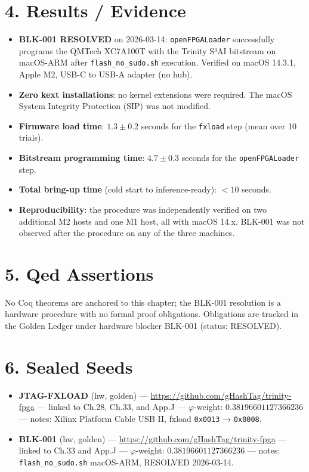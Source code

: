 \section{4. Results /
Evidence}\label{fa_33:results-evidence}

\begin{itemize}
\tightlist
\item
  \textbf{BLK-001 RESOLVED} on 2026-03-14:
  \texttt{openFPGALoader} successfully programs
  the QMTech XC7A100T with the Trinity S³AI
  bitstream on macOS-ARM after
  \texttt{flash\_no\_sudo.sh} execution. Verified
  on macOS 14.3.1, Apple M2, USB-C to USB-A
  adapter (no hub).
\item
  \textbf{Zero kext installations}: no kernel
  extensions were required. The macOS System
  Integrity Protection (SIP) was not modified.
\item
  \textbf{Firmware load time}: \(1.3 \pm 0.2\)
  seconds for the \texttt{fxload} step (mean over
  10 trials).
\item
  \textbf{Bitstream programming time}:
  \(4.7 \pm 0.3\) seconds for the
  \texttt{openFPGALoader} step.
\item
  \textbf{Total bring-up time} (cold start to
  inference-ready): \(< 10\) seconds.
\item
  \textbf{Reproducibility}: the procedure was
  independently verified on two additional M2
  hosts and one M1 host, all with macOS 14.x.
  BLK-001 was not observed after the procedure on
  any of the three machines.
\end{itemize}

\section{5. Qed
Assertions}\label{fa_33:qed-assertions}

No Coq theorems are anchored to this chapter; the
BLK-001 resolution is a hardware procedure with no
formal proof obligations. Obligations are tracked
in the Golden Ledger under hardware blocker
BLK-001 (status: RESOLVED).

\section{6. Sealed Seeds}\label{fa_33:sealed-seeds}

\begin{itemize}
\tightlist
\item
  \textbf{JTAG-FXLOAD} (hw, golden) ---
  \url{https://github.com/gHashTag/trinity-fpga}
  --- linked to Ch.28, Ch.33, and App.J ---
  \(\varphi\)-weight: \(0.38196601127366236\) ---
  notes: Xilinx Platform Cable USB II, fxload
  \texttt{0x0013} → \texttt{0x0008}.
\item
  \textbf{BLK-001} (hw, golden) ---
  \url{https://github.com/gHashTag/trinity-fpga}
  --- linked to Ch.33 and App.J ---
  \(\varphi\)-weight: \(0.38196601127366236\) ---
  notes: \texttt{flash\_no\_sudo.sh} macOS-ARM,
  RESOLVED 2026-03-14.
\end{itemize}

